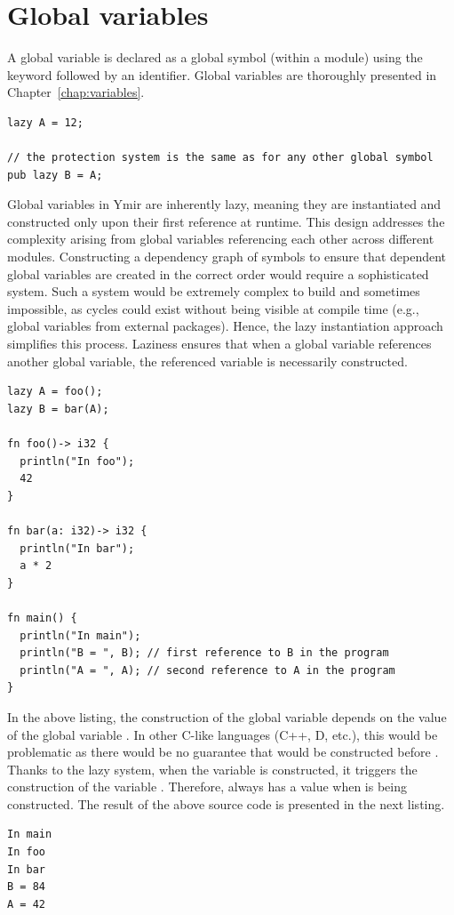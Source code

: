 \section{Global variables}%
\label{sec:global_variables}

A global variable is declared as a global symbol (within a module) using the
keyword  followed by an identifier. Global variables are thoroughly
presented in Chapter~\ref{chap:variables}.

\begin{lstlisting}[style=coloredverbatim]
lazy A = 12;

// the protection system is the same as for any other global symbol
pub lazy B = A;
\end{lstlisting}

Global variables in Ymir are inherently lazy, meaning they are instantiated and
constructed only upon their first reference at runtime. This design addresses
the complexity arising from global variables referencing each other across
different modules. Constructing a dependency graph of symbols to ensure that
dependent global variables are created in the correct order would require a
sophisticated system. Such a system would be extremely complex to build and
sometimes impossible, as cycles could exist without being visible at compile
time (e.g., global variables from external packages). Hence, the lazy
instantiation approach simplifies this process. Laziness ensures that when a
global variable references another global variable, the referenced variable is
necessarily constructed.

\begin{lstlisting}[style=coloredverbatim]
lazy A = foo();
lazy B = bar(A);

fn foo()-> i32 {
  println("In foo");
  42
}

fn bar(a: i32)-> i32 {
  println("In bar");
  a * 2
}

fn main() {
  println("In main");
  println("B = ", B); // first reference to B in the program
  println("A = ", A); // second reference to A in the program
}
\end{lstlisting}

In the above listing, the construction of the global variable  depends
on the value of the global variable . In other C-like languages (C++,
D, etc.), this would be problematic as there would be no guarantee that
 would be constructed before . Thanks to the lazy system, when
the variable  is constructed, it triggers the construction of the
variable . Therefore,  always has a value when  is
being constructed. The result of the above source code is presented in the next
listing.

\begin{lstlisting}[style=bashVerb, escapechar=@+]
In main
In foo
In bar
B = 84
A = 42
\end{lstlisting}

\vfill%
\pagebreak
